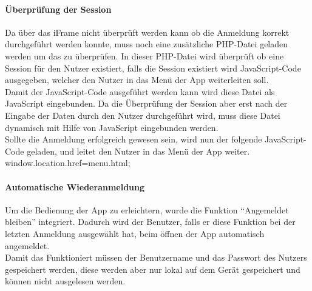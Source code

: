 \paragraph{Überprüfung der Session\\}
	
Da über das iFrame nicht überprüft werden kann ob die Anmeldung korrekt durchgeführt werden konnte, muss noch eine zusätzliche PHP-Datei geladen werden um das zu überprüfen. In dieser PHP-Datei wird überprüft ob eine Session für den Nutzer existiert, falls die Session existiert wird JavaScript-Code ausgegeben, welcher den Nutzer in das Menü der App weiterleiten soll.\\



Damit der JavaScript-Code ausgeführt werden kann wird diese Datei als JavaScript eingebunden. Da die Überprüfung der Session aber erst nach der Eingabe der Daten durch den Nutzer durchgeführt wird, muss diese Datei dynamisch mit Hilfe von JavaScript eingebunden werden.\\



Sollte die Anmeldung erfolgreich gewesen sein, wird nun der folgende JavaScript-Code geladen, und leitet den Nutzer in das Menü der App weiter.\\

window.location.href=\grq menu.html\grq;

\paragraph{Automatische Wiederanmeldung\\}
	
Um die Bedienung der App zu erleichtern, wurde die Funktion \enquote{Angemeldet bleiben} integriert. Dadurch wird der Benutzer, falls er diese Funktion bei der letzten Anmeldung ausgewählt hat, beim öffnen der App automatisch angemeldet.\\

Damit das Funktioniert müssen der Benutzername und das Passwort des Nutzers gespeichert werden, diese werden aber nur lokal auf dem Gerät gespeichert und können nicht ausgelesen werden.\\

